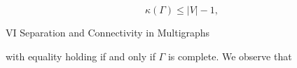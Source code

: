 $$\kappa(\Gamma) \leq |V| - 1,$$

VI Separation and Connectivity in Multigraphs

with equality holding if and only if $\Gamma$ is complete. We observe that
